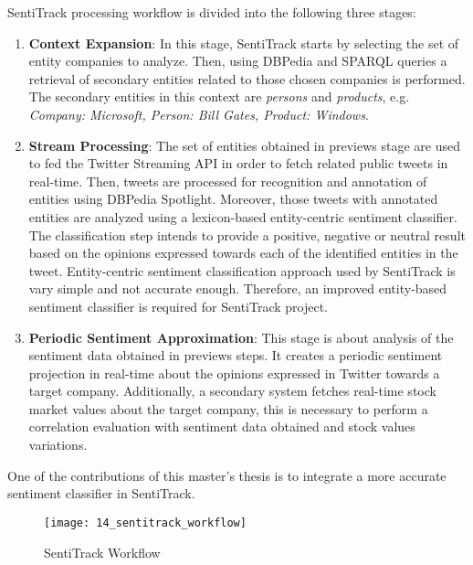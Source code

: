 {    SentiTrack processing workflow is divided into the following three stages:
    
    \begin{enumerate}
        \item \textbf{Context Expansion}: In this stage, SentiTrack starts by selecting the set of entity companies to analyze. Then, using DBPedia and SPARQL queries a retrieval of secondary entities related to those chosen companies is performed. The secondary entities in this context are \textit{persons} and \textit{products}, e.g. \textit{Company: Microsoft, Person: Bill Gates, Product: Windows}. 
        
        \item \textbf{Stream Processing}: The set of entities obtained in previews stage are used to fed the Twitter Streaming API in order to fetch related public tweets in real-time. Then, tweets are processed for recognition and annotation of entities using DBPedia Spotlight. Moreover, those tweets with annotated entities are analyzed using a lexicon-based entity-centric sentiment classifier. The classification step intends to provide a positive, negative or neutral result based on the opinions expressed towards each of the identified entities in the tweet. Entity-centric sentiment classification approach used by SentiTrack is vary simple and not accurate enough. Therefore, an improved entity-based sentiment classifier is required for SentiTrack project.
        
        \item \textbf{Periodic Sentiment Approximation}: This stage is about analysis of the sentiment data obtained in previews steps. It creates a periodic sentiment projection in real-time about the opinions expressed in Twitter towards a target company. Additionally, a secondary system fetches real-time stock market values about the target company, this is necessary to perform a correlation evaluation with sentiment data obtained and stock values variations. 
        
    \end{enumerate}
    
    One of the contributions of this master's thesis is to integrate a more accurate sentiment classifier in SentiTrack.  
    
    \begin{figure}[H]
    \centering
    \caption[SentiTrack Workflow]{SentiTrack Workflow{~\cite{danklinked}}}
    \texttt{[image: 14\_sentitrack\_workflow]}
    \label{fig14:sentitrack_workflow}
    \end{figure}
    
}
